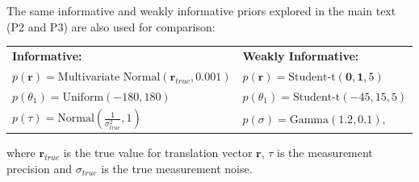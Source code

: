 \documentclass{article}
\begin{document}
The same informative and weakly informative priors explored in the main text (P2 and P3) are also used for comparison:
\begin{table}[h]
	\centering
	\begin{tabular}{ll}
		\textbf{Informative:} & \textbf{Weakly Informative:}\\
		$p(\bm{r}) = \text{Multivariate Normal}\left(\bm{r}_{true}, 0.001\right)$ & $p(\bm{r}) = \text{Student-t}(\bm{0}, \bm{1}, 5)$ \\
		$p(\theta_1) = \text{Uniform}\left(-180, 180\right)$ & $p(\theta_1) = \text{Student-t}(-45, 15, 5)$\\
		$p(\tau) =\text{Normal}\left(\frac{1}{\sigma_{true}^{2}}, 1\right)$ &	$p(\sigma) = \text{Gamma}(1.2, 0.1),$\\ 
	\end{tabular}
\end{table}

where $\bm{r}_{true}$ is the true value for translation vector $\bm{r}$, $\tau$ is the measurement precision and $\sigma_{true}$ is the true measurement noise.  
\end{document}
